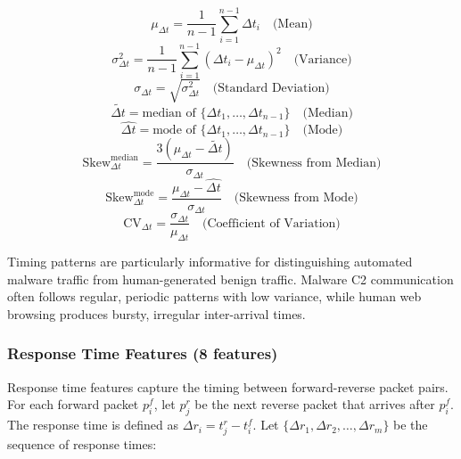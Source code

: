 \documentclass[../Main.tex]{subfiles}
\begin{document}
\begin{equation}
\mu_{\Delta t} = \frac{1}{n-1} \sum_{i=1}^{n-1} \Delta t_i \quad \text{(Mean)}
\end{equation}
\begin{equation}
\sigma_{\Delta t}^2 = \frac{1}{n-1} \sum_{i=1}^{n-1} (\Delta t_i - \mu_{\Delta t})^2 \quad \text{(Variance)}
\end{equation}
\begin{equation}
\sigma_{\Delta t} = \sqrt{\sigma_{\Delta t}^2} \quad \text{(Standard Deviation)}
\end{equation}
\begin{equation}
\widetilde{\Delta t} = \text{median of } \{\Delta t_1, \ldots, \Delta t_{n-1}\} \quad \text{(Median)}
\end{equation}
\begin{equation}
\widehat{\Delta t} = \text{mode of } \{\Delta t_1, \ldots, \Delta t_{n-1}\} \quad \text{(Mode)}
\end{equation}
\begin{equation}
\text{Skew}_{\Delta t}^{\text{median}} = \frac{3(\mu_{\Delta t} - \widetilde{\Delta t})}{\sigma_{\Delta t}} \quad \text{(Skewness from Median)}
\end{equation}
\begin{equation}
\text{Skew}_{\Delta t}^{\text{mode}} = \frac{\mu_{\Delta t} - \widehat{\Delta t}}{\sigma_{\Delta t}} \quad \text{(Skewness from Mode)}
\end{equation}
\begin{equation}
\text{CV}_{\Delta t} = \frac{\sigma_{\Delta t}}{\mu_{\Delta t}} \quad \text{(Coefficient of Variation)}
\end{equation}

Timing patterns are particularly informative for distinguishing automated malware traffic from human-generated benign traffic. Malware C2 communication often follows regular, periodic patterns with low variance, while human web browsing produces bursty, irregular inter-arrival times.

\subsubsection{Response Time Features (8 features)}

Response time features capture the timing between forward-reverse packet pairs. For each forward packet $p_i^f$, let $p_j^r$ be the next reverse packet that arrives after $p_i^f$. The response time is defined as $\Delta r_i = t_j^r - t_i^f$. Let $\{\Delta r_1, \Delta r_2, \ldots, \Delta r_m\}$ be the sequence of response times:
\end{document}
